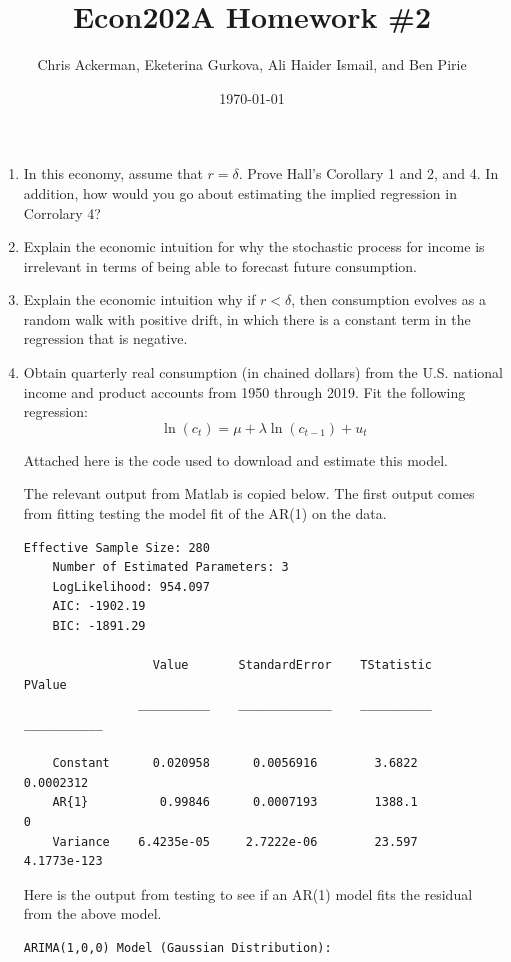 \documentclass[11pt]{article}
\author{Chris Ackerman, Eketerina Gurkova, Ali Haider Ismail, and Ben Pirie}
\date{\today}
\title{Econ202A Homework \#2}
\begin{document}
\maketitle
\newpage

\begin{enumerate}
\item In this economy, assume that $r = \delta$. Prove Hall’s Corollary 1 and 2, and 4. In addition, how would you go about estimating the implied regression in Corrolary 4?

\newpage
\item Explain the economic intuition for why the stochastic process for income is irrelevant in terms of being able to forecast future consumption. 

\newpage
\item Explain the economic intuition why if $r < \delta$, then consumption evolves as a random walk with positive drift, in which there is a constant term in the regression that is negative. 

\newpage
\item  Obtain quarterly real consumption (in chained dollars) from the U.S.
national income and product accounts from 1950 through 2019. Fit the following
regression:
\[
\ln(c_t) = \mu + \lambda \ln(c_{t-1}) + u_t
\]

Attached here is the code used to download and estimate this model.



The relevant output from Matlab is copied below.
The first output comes from fitting testing the model fit of the AR(1) on the data.
\begin{lstlisting}[caption={Matlab output from AR(1) model on data}, label=lst:data-output]
    Effective Sample Size: 280
    Number of Estimated Parameters: 3
    LogLikelihood: 954.097
    AIC: -1902.19
    BIC: -1891.29
 
                  Value       StandardError    TStatistic      PValue   
                __________    _____________    __________    ___________

    Constant      0.020958      0.0056916        3.6822        0.0002312
    AR{1}          0.99846      0.0007193        1388.1                0
    Variance    6.4235e-05     2.7222e-06        23.597      4.1773e-123
\end{lstlisting}

Here is the output from testing to see if an AR(1) model fits the residual from the above model.
\begin{lstlisting}[caption={Matlab output from AR(1) model on residuals}, label=lst:resid-output]
    ARIMA(1,0,0) Model (Gaussian Distribution):
 

\end{lstlisting}
\end{enumerate}
\end{document}
